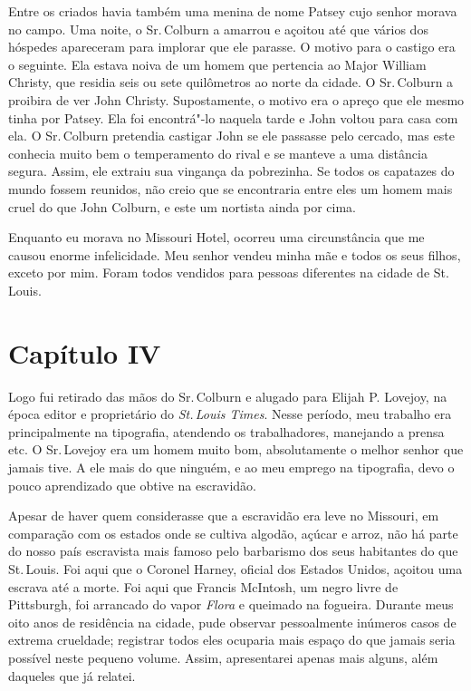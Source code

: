 Entre os criados havia também uma menina de nome Patsey cujo senhor
morava no campo. Uma noite, o Sr.\,Colburn a amarrou e açoitou até que
vários dos hóspedes apareceram para implorar que ele parasse. O motivo
para o castigo era o seguinte. Ela estava noiva de um homem que
pertencia ao Major William Christy, que residia seis ou sete quilômetros
ao norte da cidade. O Sr.\,Colburn a proibira de ver John Christy.
Supostamente, o motivo era o apreço que ele mesmo tinha por Patsey. Ela
foi encontrá"-lo naquela tarde e John voltou para casa com ela. O Sr.\,Colburn pretendia castigar John se ele passasse pelo cercado, mas este
conhecia muito bem o temperamento do rival e se manteve a uma distância
segura. Assim, ele extraiu sua vingança da pobrezinha. Se todos os
capatazes do mundo fossem reunidos, não creio que se encontraria entre
eles um homem mais cruel do que John Colburn, e este um nortista ainda
por cima.

Enquanto eu morava no Missouri Hotel, ocorreu uma circunstância que me
causou enorme infelicidade. Meu senhor vendeu minha mãe e todos os seus
filhos, exceto por mim. Foram todos vendidos para pessoas diferentes na
cidade de St.\,Louis.

\chapter*{Capítulo IV}

Logo fui retirado das mãos do Sr.\,Colburn e alugado para Elijah P.
Lovejoy, na época editor e proprietário do \emph{St.\,Louis Times}. Nesse
período, meu trabalho era principalmente na tipografia, atendendo os
trabalhadores, manejando a prensa etc. O Sr.\,Lovejoy era um homem muito
bom, absolutamente o melhor senhor que jamais tive. A ele mais do que
ninguém, e ao meu emprego na tipografia, devo o pouco aprendizado que
obtive na escravidão.

Apesar de haver quem considerasse que a escravidão era leve no Missouri,
em comparação com os estados onde se cultiva algodão, açúcar e arroz,
não há parte do nosso país escravista mais famoso pelo barbarismo dos
seus habitantes do que St.\,Louis. Foi aqui que o Coronel Harney, oficial
dos Estados Unidos, açoitou uma escrava até a morte. Foi aqui que
Francis McIntosh, um negro livre de Pittsburgh, foi arrancado do vapor
\emph{Flora} e queimado na fogueira. Durante meus oito anos de
residência na cidade, pude observar pessoalmente inúmeros casos de
extrema crueldade; registrar todos eles ocuparia mais espaço do que
jamais seria possível neste pequeno volume. Assim, apresentarei apenas
mais alguns, além daqueles que já relatei.

